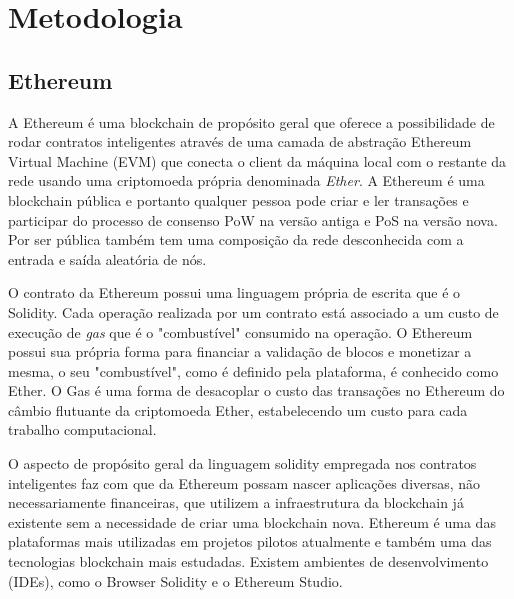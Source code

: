 \documentclass[12pt]{article}
\begin{document}
\section{Metodologia}
     
\subsection{Ethereum}

A Ethereum é uma blockchain de propósito geral que oferece a possibilidade de rodar contratos inteligentes através de uma camada de abstração Ethereum Virtual Machine (EVM) que conecta o client da máquina local com o restante da rede usando uma criptomoeda própria denominada \textit{Ether}. A Ethereum é uma blockchain pública e portanto qualquer pessoa pode criar e ler transações e participar do processo de consenso PoW na versão antiga e PoS na versão nova. Por ser pública também tem uma composição da rede desconhecida com a entrada e saída aleatória de nós. 

O contrato da Ethereum possui uma linguagem própria de escrita que é o Solidity. Cada operação realizada por um contrato está associado a um custo de execução de \emph{gas} que é o "combustível" consumido na operação\cite{miers2019analise}. 
O Ethereum possui sua própria forma para financiar a validação de blocos e monetizar a mesma, o seu "combustível", como é definido pela plataforma, é conhecido como Ether. O Gas é uma forma de desacoplar o custo das transações no Ethereum do câmbio flutuante da criptomoeda Ether, estabelecendo um custo para cada trabalho computacional.

O aspecto de propósito geral da linguagem solidity empregada nos contratos inteligentes faz com que da Ethereum possam nascer aplicações diversas, não necessariamente financeiras, que utilizem a infraestrutura da blockchain já existente sem a necessidade de criar uma blockchain nova. Ethereum é uma das plataformas mais utilizadas em projetos pilotos atualmente e também uma das tecnologias blockchain mais estudadas. Existem ambientes de desenvolvimento (IDEs), como o Browser Solidity e o Ethereum Studio.
\end{document}
